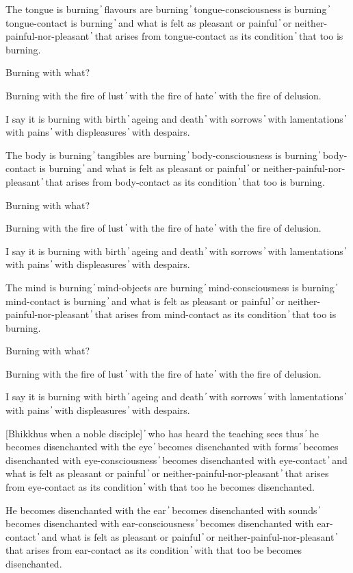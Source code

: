 The tongue is burning  ̓  flavours are burning  ̓  tongue-consciousness is burning  ̓  tongue-contact is burning  ̓  and what is felt as pleasant or painful  ̓  or neither-painful-nor-pleasant  ̓  that arises from tongue-contact as its condition  ̓  that too is burning.

Burning with what?

Burning with the fire of lust  ̓  with the fire of hate  ̓  with the fire of delusion.

I say it is burning with birth  ̓  ageing and death  ̓  with sorrows  ̓  with lamentations  ̓  with pains  ̓  with displeasures  ̓  with despairs.

The body is burning  ̓  tangibles are burning  ̓  body-consciousness is burning  ̓  body-contact is burning  ̓  and what is felt as pleasant or painful  ̓  or neither-painful-nor-pleasant  ̓  that arises from body-contact as its condition  ̓  that too is burning.

Burning with what?

Burning with the fire of lust  ̓  with the fire of hate  ̓  with the fire of delusion.

I say it is burning with birth  ̓  ageing and death  ̓  with sorrows  ̓  with lamentations  ̓  with pains  ̓  with displeasures  ̓  with despairs.

The mind is burning  ̓  mind-objects are burning  ̓  mind-consciousness is burning  ̓  mind-contact is burning  ̓  and what is felt as pleasant or painful  ̓  or neither-painful-nor-pleasant  ̓  that arises from mind-contact as its condition  ̓  that too is burning.

Burning with what?

Burning with the fire of lust  ̓  with the fire of hate  ̓  with the fire of delusion.

I say it is burning with birth  ̓  ageing and death  ̓  with sorrows  ̓  with lamentations  ̓  with pains  ̓  with displeasures  ̓  with despairs.

[Bhikkhus when a noble disciple]  ̓  who has heard the teaching sees thus  ̓  he becomes disenchanted with the eye  ̓  becomes disenchanted with forms  ̓  becomes disenchanted with eye-consciousness  ̓  becomes disenchanted with eye-contact  ̓  and what is felt as pleasant or painful  ̓  or neither-painful-nor-pleasant  ̓  that arises from eye-contact as its condition  ̓  with that too he becomes disenchanted.

He becomes disenchanted with the ear  ̓  becomes disenchanted with sounds  ̓  becomes disenchanted with ear-consciousness  ̓  becomes disenchanted with ear-contact  ̓  and what is felt as pleasant or painful  ̓  or neither-painful-nor-pleasant  ̓  that arises from ear-contact as its condition  ̓  with that too be becomes disenchanted.

